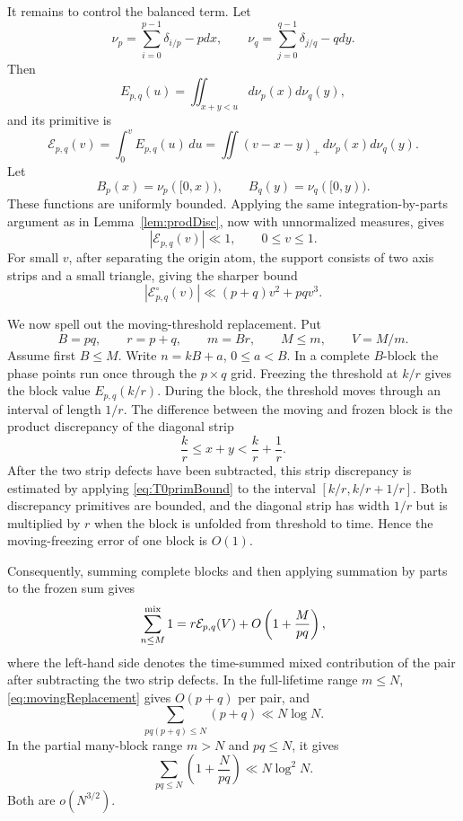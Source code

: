 \documentclass[a4paper,american,11pt]{amsart}
\theoremstyle{plain}
\theoremstyle{definition}
\newcommand{\dd}{\,d}
\begin{document}
It remains to control the balanced term.  Let
\[
 \nu_p=\sum_{i=0}^{p-1}\delta_{i/p}-pdx,
 \qquad
 \nu_q=\sum_{j=0}^{q-1}\delta_{j/q}-qdy.
\]
Then
\[
 E_{p,q}(u)=\iint_{x+y<u}d\nu_p(x)d\nu_q(y),
\]
and its primitive is
\begin{equation}\label{eq:T0prim}
 \mathcal E_{p,q}(v)=\int_0^vE_{p,q}(u)\dd u
 =\iint (v-x-y)_+\,d\nu_p(x)d\nu_q(y).
\end{equation}
Let
\[
 B_p(x)=\nu_p([0,x)),
 \qquad
 B_q(y)=\nu_q([0,y)).
\]
These functions are uniformly bounded.  Applying the same integration-by-parts
argument as in Lemma~\ref{lem:prodDisc}, now with unnormalized measures, gives
\begin{equation}\label{eq:T0primBound}
 |\mathcal E_{p,q}(v)|\ll1,
 \qquad 0\le v\le1.
\end{equation}
For small \(v\), after separating the origin atom, the support consists of two
axis strips and a small triangle, giving the sharper bound
\begin{equation}\label{eq:smallv}
 |\mathcal E^\circ_{p,q}(v)|\ll (p+q)v^2+pqv^3.
\end{equation}

We now spell out the moving-threshold replacement.  Put
\[
 B=pq,
 \qquad
 r=p+q,
 \qquad
 m=Br,
 \qquad
 M\le m,
 \qquad
 V=M/m.
\]
Assume first \(B\le M\).  Write \(n=kB+a\), \(0\le a<B\).  In a complete
\(B\)-block the phase points run once through the \(p\times q\) grid.  Freezing
the threshold at \(k/r\) gives the block value \(E_{p,q}(k/r)\).  During the
block, the threshold moves through an interval of length \(1/r\).  The
difference between the moving and frozen block is the product discrepancy of
the diagonal strip
\[
 \frac{k}{r}\le x+y<\frac{k}{r}+\frac1r.
\]
After the two strip defects have been subtracted, this strip discrepancy is
estimated by applying \eqref{eq:T0primBound} to the interval
\([k/r,k/r+1/r]\).  Both discrepancy primitives are bounded, and the diagonal
strip has width \(1/r\) but is multiplied by \(r\) when the block is unfolded
from threshold to time.  Hence the moving-freezing error of one block is
\(O(1)\).

Consequently, summing complete blocks and then applying summation by parts to
the frozen sum gives
\begin{equation}\label{eq:movingReplacement}
 \sum_{n\le M}^{\rm mix}1
 =r\mathcal E_{p,q}(V)+O\left(1+\frac{M}{pq}\right),
\end{equation}
where the left-hand side denotes the time-summed mixed contribution of the
pair after subtracting the two strip defects.  In the full-lifetime range
\(m\le N\), \eqref{eq:movingReplacement} gives \(O(p+q)\) per pair, and
\[
 \sum_{pq(p+q)\le N}(p+q)
 \ll N\log N.
\]
In the partial many-block range \(m>N\) and \(pq\le N\), it gives
\[
 \sum_{pq\le N}\left(1+\frac{N}{pq}\right)
 \ll N\log^2N.
\]
Both are \(o(N^{3/2})\).
\end{document}
